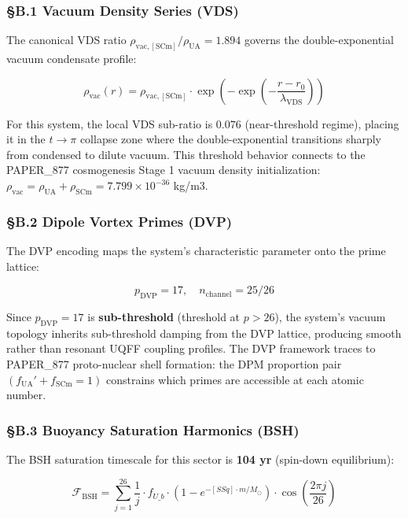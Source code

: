 \subsubsection{§B.1 Vacuum Density Series
(VDS)}\label{b.1-vacuum-density-series-vds}

The canonical VDS ratio
\(\rho_{\mathrm{vac,[SCm]}} / \rho_{\mathrm{UA}} = 1.894\) governs the
double-exponential vacuum condensate profile:

\[\rho_{\mathrm{vac}}(r) = \rho_{\mathrm{vac,[SCm]}} \cdot \exp\!\left(-\exp\!\left(-\frac{r - r_0}{\lambda_{\mathrm{VDS}}}\right)\right)\]

For this system, the local VDS sub-ratio is \(0.076\) (near-threshold
regime), placing it in the \(t \to \pi\) collapse zone where the
double-exponential transitions sharply from condensed to dilute vacuum.
This threshold behavior connects to the PAPER\_877 cosmogenesis Stage 1
vacuum density initialization:
\(\rho_{\mathrm{vac}} = \rho_{\mathrm{UA}} + \rho_{\mathrm{SCm}} = 7.799 \times 10^{-36}\)
kg/m3.

\subsubsection{§B.2 Dipole Vortex Primes
(DVP)}\label{b.2-dipole-vortex-primes-dvp}

The DVP encoding maps the system's characteristic parameter onto the
prime lattice:

\[p_{\mathrm{DVP}} = 17, \quad n_{\mathrm{channel}} = 25/26\]

Since \(p_{\mathrm{DVP}} = 17\) is \textbf{sub-threshold} (threshold at
\(p > 26\)), the system's vacuum topology inherits sub-threshold damping
from the DVP lattice, producing smooth rather than resonant UQFF
coupling profiles. The DVP framework traces to PAPER\_877 proto-nuclear
shell formation: the DPM proportion pair
\((f_{\mathrm{UA}}' + f_{\mathrm{SCm}} = 1)\) constrains which primes
are accessible at each atomic number.

\subsubsection{§B.3 Buoyancy Saturation Harmonics
(BSH)}\label{b.3-buoyancy-saturation-harmonics-bsh}

The BSH saturation timescale for this sector is \textbf{104 yr}
(spin-down equilibrium):

\[\mathcal{F}_{\mathrm{BSH}} = \sum_{j=1}^{26} \frac{1}{j} \cdot f_{U\_b} \cdot \left(1 - e^{-[SSq] \cdot m/M_\odot}\right) \cdot \cos\!\left(\frac{2\pi j}{26}\right)\]

